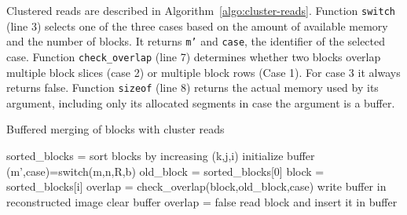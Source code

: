 \documentclass[10pt, conference, compsocconf]{IEEEtran}
\begin{document}
Clustered reads are described in
Algorithm~\ref{algo:cluster-reads}. Function \texttt{switch} (line 3)
selects one of the three cases based on the amount of available memory
and the number of blocks. It returns \texttt{m'} and \texttt{case},
the identifier of the selected case. Function \texttt{check\_overlap}
(line 7) determines whether two blocks overlap multiple block slices
(case 2) or multiple block rows (Case 1). For case 3 it always returns
false.  Function \texttt{sizeof} (line 8) returns the actual memory
used by its argument, including only its allocated segments in case
the argument is a buffer.
\begin{algorithm}[h]
  \caption{Buffered merging of blocks with cluster reads}
  \label{algo:cluster-reads}
  \begin{algorithmic}[1]
    \STATE sorted\_blocks = sort blocks by increasing (k,j,i)
    \STATE initialize buffer
    \STATE (m',case)=switch(m,n,R,b)
    \STATE old\_block = sorted\_blocks[0]
      \STATE block = sorted\_blocks[i]
      \STATE overlap = check\_overlap(block,old\_block,case)
      \STATE write buffer in reconstructed image
      \STATE clear buffer
      \STATE overlap = false
      \ENDIF
      \STATE read block and insert it in buffer
      \ENDFOR
  \end{algorithmic}
\end{algorithm}
\end{document}
